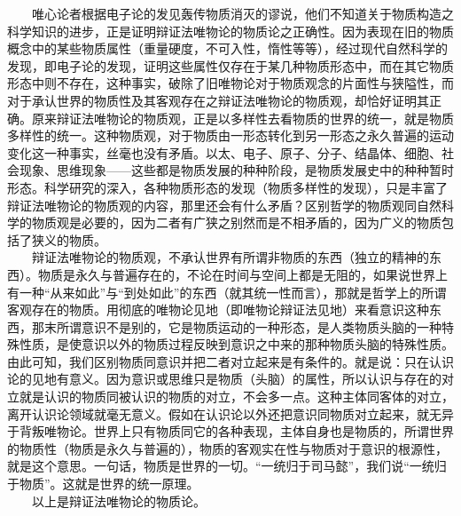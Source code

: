 \documentclass[cn,11pt,chinese]{elegantbook}
\begin{document}
　　唯心论者根据电子论的发见轰传物质消灭的谬说，他们不知道关于物质构造之科学知识的进步，正是证明辩证法唯物论的物质论之正确性。因为表现在旧的物质概念中的某些物质属性（重量硬度，不可入性，惰性等等），经过现代自然科学的发现，即电子论的发现，证明这些属性仅存在于某几种物质形态中，而在其它物质形态中则不存在，这种事实，破除了旧唯物论对于物质观念的片面性与狭隘性，而对于承认世界的物质性及其客观存在之辩证法唯物论的物质观，却恰好证明其正确。原来辩证法唯物论的物质观，正是以多样性去看物质的世界的统一，就是物质多样性的统一。这种物质观，对于物质由一形态转化到另一形态之永久普遍的运动变化这一种事实，丝毫也没有矛盾。以太、电子、原子、分子、结晶体、细胞、社会现象、思维现象——这些都是物质发展的种种阶段，是物质发展史中的种种暂时形态。科学研究的深入，各种物质形态的发现（物质多样性的发现），只是丰富了辩证法唯物论的物质观的内容，那里还会有什么矛盾？区别哲学的物质观同自然科学的物质观是必要的，因为二者有广狭之别然而是不相矛盾的，因为广义的物质包括了狭义的物质。\\
　　辩证法唯物论的物质观，不承认世界有所谓非物质的东西（独立的精神的东西）。物质是永久与普遍存在的，不论在时间与空间上都是无阻的，如果说世界上有一种“从来如此”与“到处如此”的东西（就其统一性而言），那就是哲学上的所谓客观存在的物质。用彻底的唯物论见地（即唯物论辩证法见地）来看意识这种东西，那末所谓意识不是别的，它是物质运动的一种形态，是人类物质头脑的一种特殊性质，是使意识以外的物质过程反映到意识之中来的那种物质头脑的特殊性质。由此可知，我们区别物质同意识并把二者对立起来是有条件的。就是说：只在认识论的见地有意义。因为意识或思维只是物质（头脑）的属性，所以认识与存在的对立就是认识的物质同被认识的物质的对立，不会多一点。这种主体同客体的对立，离开认识论领域就毫无意义。假如在认识论以外还把意识同物质对立起来，就无异于背叛唯物论。世界上只有物质同它的各种表现，主体自身也是物质的，所谓世界的物质性（物质是永久与普遍的），物质的客观实在性与物质对于意识的根源性，就是这个意思。一句话，物质是世界的一切。“一统归于司马懿”，我们说“一统归于物质”。这就是世界的统一原理。\\
　　以上是辩证法唯物论的物质论。\\
\end{document}
